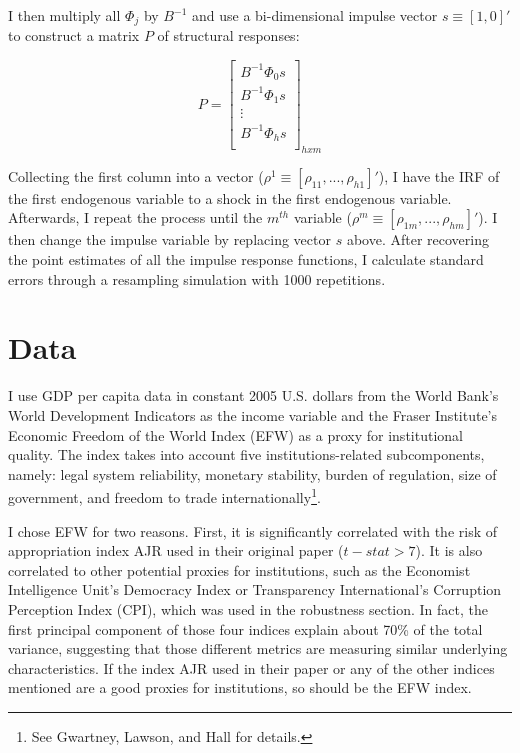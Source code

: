 \documentclass{article}
\begin{document}
I then multiply all $\Phi_j$ by $B^{-1}$ and use a bi-dimensional impulse vector $s \equiv [1, 0]'$ to construct a matrix $P$ of structural responses:

\begin{equation}
    P = 
    \begin{bmatrix}
        B^{-1} \Phi_0 s \\
        B^{-1} \Phi_1 s \\
            \vdots \\
        B^{-1} \Phi_h s \\
    \end{bmatrix}_{hxm}
\end{equation}

Collecting the first column into a vector ($\rho^1 \equiv [\rho_{11}, ... , \rho_{h1}]'$), I have the IRF of the first endogenous variable to a shock in the first endogenous variable. Afterwards, I repeat the process until the $m^{th}$ variable ($\rho^m \equiv [\rho_{1m}, ... , \rho_{hm}]'$). I then change the impulse variable by replacing vector $s$ above. After recovering the point estimates of all the impulse response functions, I calculate standard errors through a resampling simulation with 1000 repetitions.

\section{Data}

I use GDP per capita data in constant 2005 U.S. dollars from the World Bank's World Development Indicators as the income variable and the Fraser Institute's Economic Freedom of the World Index (EFW) as a proxy for institutional quality. The index takes into account five institutions-related subcomponents, namely: legal system reliability, monetary stability, burden of regulation, size of government, and freedom to trade internationally\footnote{See Gwartney, Lawson, and Hall \parencite*{efw} for details.}.

I chose EFW for two reasons. First, it is significantly correlated with the risk of appropriation index AJR used in their original paper ($t-stat > 7$). It is also correlated to other potential proxies for institutions, such as the Economist Intelligence Unit's Democracy Index or Transparency International's Corruption Perception Index (CPI), which was used in the robustness section. In fact, the first principal component of those four indices explain about 70\% of the total variance, suggesting that those different metrics are measuring similar underlying characteristics. If the index AJR used in their paper or any of the other indices mentioned are a good proxies for institutions, so should be the EFW index.
\end{document}
